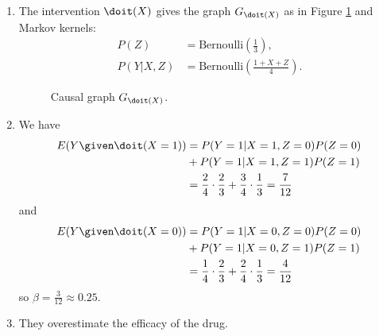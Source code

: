 \begin{enumerate}[label=7.\arabic*]
\begin{ungradedsolution}
\begin{enumerate}
            \item The intervention $\doit(X)$ gives the graph $G_{\doit(X)}$ as in Figure \ref{fig:two} and Markov kernels:
            \begin{align*}
                P(Z)     & = \mathrm{Bernoulli}\left(\frac{1}{3}\right),     \\
                P(Y|X,Z) & = \mathrm{Bernoulli}\left(\frac{1+X+Z}{4}\right).
            \end{align*}
            \begin{figure}[!ht]
                \centering
                \caption{Causal graph $G_{\doit(X)}$.}
                \label{fig:two}
            \end{figure}

            \item
            We have
            \begin{align*}
                E(Y\given \doit(X=1)) & = P(Y=1 | X=1, Z=0)P(Z=0)                                                  \\
                                      & + P(Y=1 | X=1, Z=1)P(Z=1)                                                  \\
                                      & = \frac{2}{4}\cdot\frac{2}{3} + \frac{3}{4}\cdot\frac{1}{3} = \frac{7}{12}
            \end{align*}
            and
            \begin{align*}
                E(Y\given \doit(X=0)) & = P(Y=1 | X=0, Z=0)P(Z=0)                                                  \\
                                      & + P(Y=1 | X=0, Z=1)P(Z=1)                                                  \\
                                      & = \frac{1}{4}\cdot\frac{2}{3} + \frac{2}{4}\cdot\frac{1}{3} = \frac{4}{12}
            \end{align*}
            so $\beta = \frac{3}{12} \approx 0.25$.
            \item They overestimate the efficacy of the drug.
        \end{enumerate}
    \end{ungradedsolution}


\end{enumerate}
